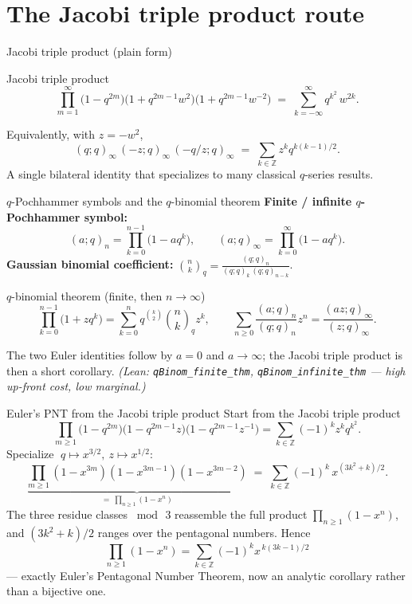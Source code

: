 \documentclass[10pt]{beamer}
\newcommand{\qpoch}[2]{(#1;#2)}
\begin{document}
\section{The Jacobi triple product route}

\begin{frame}{Jacobi triple product (plain form)}
\begin{block}{Jacobi triple product}
\[
\prod_{m=1}^{\infty}\bigl(1-q^{2m}\bigr)\bigl(1+q^{2m-1}w^{2}\bigr)\bigl(1+q^{2m-1}w^{-2}\bigr)
\;=\;\sum_{k=-\infty}^{\infty} q^{k^{2}}\,w^{2k}.
\]
\end{block}
Equivalently, with $z=-w^{2}$,
\[
\qpoch{q}{q}_\infty\,\qpoch{-z}{q}_\infty\,\qpoch{-q/z}{q}_\infty
\;=\;\sum_{k\in\mathbb Z} z^{k}q^{k(k-1)/2}.
\]
A single bilateral identity that specializes to many classical $q$-series results.
\end{frame}

\begin{frame}{$q$-Pochhammer symbols and the $q$-binomial theorem}
\textbf{Finite / infinite $q$-Pochhammer symbol:}
\[
\qpoch{a}{q}_n=\prod_{k=0}^{n-1}\bigl(1-a q^{k}\bigr),\qquad
\qpoch{a}{q}_\infty=\prod_{k=0}^{\infty}\bigl(1-a q^{k}\bigr).
\]
\textbf{Gaussian binomial coefficient:}
$\displaystyle \binom{n}{k}_q=\frac{\qpoch{q}{q}_n}{\qpoch{q}{q}_k\,\qpoch{q}{q}_{n-k}}$.
\medskip
\begin{block}{$q$-binomial theorem (finite, then $n\to\infty$)}
\[
\prod_{k=0}^{n-1}\bigl(1+z q^{k}\bigr)=\sum_{k=0}^{n} q^{\binom{k}{2}}\binom{n}{k}_q z^{k},
\qquad
\sum_{n\ge0}\frac{\qpoch{a}{q}_n}{\qpoch{q}{q}_n}z^{n}=\frac{\qpoch{az}{q}_\infty}{\qpoch{z}{q}_\infty}.
\]
\end{block}
\footnotesize The two Euler identities follow by $a=0$ and $a\to\infty$; the Jacobi
triple product is then a short corollary. \emph{(Lean: \texttt{qBinom\_finite\_thm},
\texttt{qBinom\_infinite\_thm} --- high up-front cost, low marginal.)}
\end{frame}

\begin{frame}{Euler's PNT from the Jacobi triple product}
Start from the Jacobi triple product
\[
\prod_{m\ge1}\bigl(1-q^{2m}\bigr)\bigl(1-q^{2m-1}z\bigr)\bigl(1-q^{2m-1}z^{-1}\bigr)
=\sum_{k\in\mathbb Z}(-1)^{k}z^{k}q^{k^{2}}.
\]
\pause
Specialize $\;q\mapsto x^{3/2},\ z\mapsto x^{1/2}$:
\[
\underbrace{\prod_{m\ge1}(1-x^{3m})(1-x^{3m-1})(1-x^{3m-2})}_{=\ \prod_{n\ge1}(1-x^{n})}
\;=\;\sum_{k\in\mathbb Z}(-1)^{k}\,x^{(3k^{2}+k)/2}.
\]
\pause
The three residue classes $\bmod\,3$ reassemble the full product $\prod_{n\ge1}(1-x^n)$,
and $(3k^{2}+k)/2$ ranges over the pentagonal numbers. Hence
\[
\boxed{\ \prod_{n\ge1}(1-x^{n})=\sum_{k\in\mathbb Z}(-1)^{k}x^{\,k(3k-1)/2}\ }
\]
--- exactly Euler's Pentagonal Number Theorem, now an analytic corollary rather than
a bijective one.
\end{frame}
\end{document}
